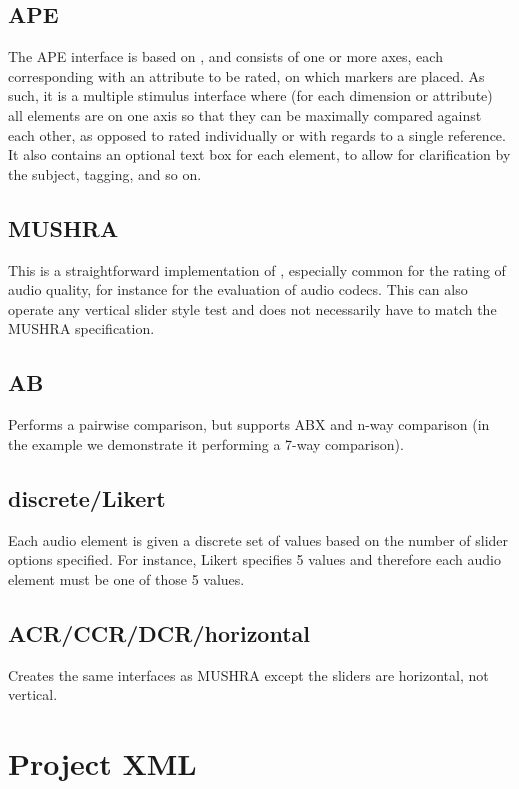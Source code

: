 \documentclass[11pt, oneside]{article}   	%
\begin{document}
	\subsection{APE}
		The APE interface is based on \cite{ape}, and consists of one or more axes, each corresponding with an attribute to be rated, on which markers are placed. As such, it is a multiple stimulus interface where (for each dimension or attribute) all elements are on one axis so that they can be maximally compared against each other, as opposed to rated individually or with regards to a single reference. 
		It also contains an optional text box for each element, to allow for clarification by the subject, tagging, and so on. 

	\subsection{MUSHRA}
		This is a straightforward implementation of \cite{mushra}, especially common for the rating of audio quality, for instance for the evaluation of audio codecs. This can also operate any vertical slider style test and does not necessarily have to match the MUSHRA specification.
		
	\subsection{AB}
	    Performs a pairwise comparison, but supports ABX and n-way comparison (in the example we demonstrate it performing a 7-way comparison).
	    
	\subsection{discrete/Likert}
	    Each audio element is given a discrete set of values based on the number of slider options specified. For instance, Likert specifies 5 values and therefore each audio element must be one of those 5 values.
	    
	\subsection{ACR/CCR/DCR/horizontal}
	    Creates the same interfaces as MUSHRA except the sliders are horizontal, not vertical.

	
\clearpage

\section{Project XML}
\end{document}
